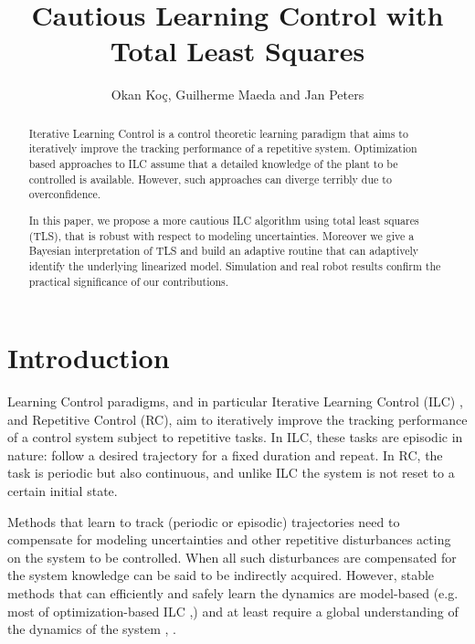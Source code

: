 \documentclass[10pt,a4paper]{article}
\author{Okan Ko\c c, Guilherme Maeda and Jan Peters}
\title{Cautious Learning Control with Total Least Squares}
\begin{document}
\maketitle
\thispagestyle{empty}
\pagestyle{empty}

\begin{abstract}

Iterative Learning Control is a control theoretic learning paradigm that aims to iteratively improve the tracking performance of a repetitive system. Optimization based approaches to ILC assume that a detailed knowledge of the plant to be controlled is available. However, such approaches can diverge terribly due to overconfidence. 

In this paper, we propose a more cautious ILC algorithm using total least squares (TLS), that is robust with respect to modeling uncertainties. Moreover we give a Bayesian interpretation of TLS and build an adaptive routine that can adaptively identify the underlying linearized model. Simulation and real robot results confirm the practical significance of our contributions. %
\end{abstract}



\section{Introduction}

Learning Control paradigms, and in particular Iterative Learning Control (ILC) \cite{Arimoto84}, \cite{Bristow06} and Repetitive Control (RC), aim to iteratively improve the tracking performance of a control system subject to repetitive tasks. In ILC, these tasks are episodic in nature: follow a desired trajectory for a fixed duration and repeat. In RC, the task is periodic but also continuous, and unlike ILC the system is not reset to a certain initial state. 

Methods that learn to track (periodic or episodic) trajectories need to compensate for modeling uncertainties and other repetitive disturbances acting on the system to be controlled. When all such disturbances are compensated for the system knowledge can be said to be indirectly acquired. However, stable methods that can efficiently and safely learn the dynamics are model-based (e.g. most of optimization-based ILC \cite{Amann95},\cite{Bristow06}) and at least require a global understanding of the dynamics of the system \cite{Kolter09}, \cite{NguyenTuong11}.
\end{document}
